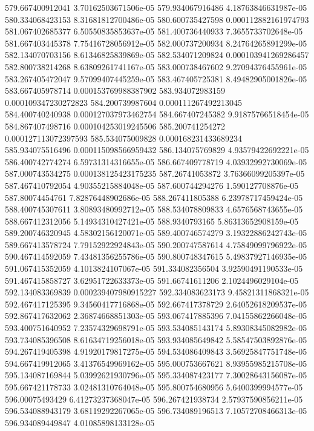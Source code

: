 {579.667400912041 3.70162503671506e-05
579.934067916486 4.18763846631987e-05
580.334068423153 8.31681812700486e-05
580.600735427598 0.000112882161974793
581.067402685377 6.50550835853637e-05
581.400736440933 7.3655733702648e-05
581.667403445378 7.75416728056912e-05
582.000737200934 8.24764265891299e-05
582.134070703156 8.61346825839869e-05
582.534071209824 0.000103941269286457
582.800738214268 8.63809261741167e-05
583.000738467602 9.27094376455961e-05
583.267405472047 9.57099407445259e-05
583.467405725381 8.49482905001826e-05
583.667405978714 0.000153769988387902
583.934072983159 0.000109347230272823
584.200739987604 0.000111267492213045
584.400740240938 0.000127037973462754
584.667407245382 9.91875766518454e-05
584.867407498716 0.000104253019245506
585.200741254272 0.000127113072397593
585.534075009828 0.000168231433689234
585.934075516496 0.000115098566959432
586.134075769829 4.93579422692221e-05
586.400742774274 6.59731314316655e-05
586.667409778719 4.03932992730069e-05
587.000743534275 0.000138125423175235
587.26741053872 3.76366099205397e-05
587.467410792054 4.90355215884048e-05
587.600744294276 1.590127708876e-05
587.80074454761 7.82876448902686e-05
588.267411805388 6.23978717459424e-05
588.400745307611 3.80893480992712e-05
588.534078809833 4.6576568743655e-05
588.667412312056 5.14934310427421e-05
588.9340793165 5.86313652908159e-05
589.200746320945 4.58302156120071e-05
589.400746574279 3.19322886242743e-05
589.667413578724 7.79152922924843e-05
590.200747587614 4.75849099796922e-05
590.467414592059 7.43481356255786e-05
590.800748347615 5.49837927146935e-05
591.067415352059 4.1013824107067e-05
591.334082356504 3.92590491190533e-05
591.467415858727 3.62951722633373e-05
591.66741611206 2.1024496029104e-05
592.134083369839 0.000239407980915227
592.334083623173 9.45821311868321e-05
592.467417125395 9.34560417716868e-05
592.667417378729 2.64052618209537e-05
592.867417632062 2.36874668851303e-05
593.067417885396 7.04155862266048e-05
593.400751640952 7.23574329698791e-05
593.534085143174 5.89308345082982e-05
593.734085396508 8.61634719256018e-05
593.934085649842 5.58547503892876e-05
594.267419405398 4.91920179817275e-05
594.534086409843 3.56925847751748e-05
594.667419912065 3.41376549969162e-05
595.000753667621 8.93955985215708e-05
595.134087169844 5.03992621930796e-05
595.334087423177 7.30028643156087e-05
595.667421178733 3.02481310764048e-05
595.800754680956 5.6400399994577e-05
596.00075493429 6.41273237368047e-05
596.267421938734 2.57937590856211e-05
596.534088943179 3.68119292267065e-05
596.734089196513 7.10572708466313e-05
596.934089449847 4.01085898133128e-05
}

